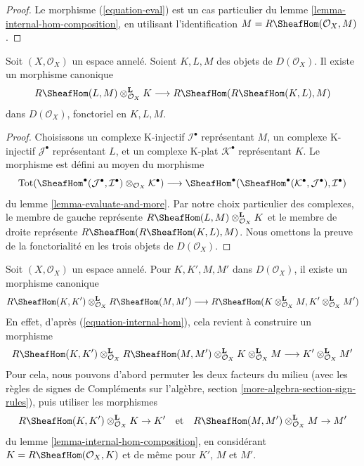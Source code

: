 \begin{proof}
Le morphisme (\ref{equation-eval}) est un cas particulier du lemme \ref{lemma-internal-hom-composition}, en utilisant l'identification $M = R\SheafHom(\mathcal{O}_X, M)$.
\end{proof}

\begin{lemma}

\label{lemma-internal-hom-evaluate}
Soit $(X, \mathcal{O}_X)$ un espace annelé. Soient $K, L, M$ des objets de $D(\mathcal{O}_X)$. Il existe un morphisme canonique $$
R\SheafHom(L, M) \otimes_{\mathcal{O}_X}^\mathbf{L} K
\longrightarrow
R\SheafHom(R\SheafHom(K, L), M)
$$ dans $D(\mathcal{O}_X)$, fonctoriel en $K, L, M$.
\end{lemma}

\begin{proof}
Choisissons un complexe K-injectif $\mathcal{I}^\bullet$ représentant $M$, un complexe K-injectif $\mathcal{J}^\bullet$ représentant $L$, et un complexe K-plat $\mathcal{K}^\bullet$ représentant $K$. Le morphisme est défini au moyen du morphisme $$
\text{Tot}(\SheafHom^\bullet(\mathcal{J}^\bullet,
\mathcal{I}^\bullet) \otimes_{\mathcal{O}_X} \mathcal{K}^\bullet)
\longrightarrow
\SheafHom^\bullet(\SheafHom^\bullet(\mathcal{K}^\bullet,
\mathcal{J}^\bullet), \mathcal{I}^\bullet)
$$ du lemme \ref{lemma-evaluate-and-more}. Par notre choix particulier des complexes, le membre de gauche représente $R\SheafHom(L, M) \otimes_{\mathcal{O}_X}^\mathbf{L} K$ et le membre de droite représente $R\SheafHom(R\SheafHom(K, L), M)$. Nous omettons la preuve de la fonctorialité en les trois objets de $D(\mathcal{O}_X)$.
\end{proof}

\begin{remark}

\label{remark-tensor-internal-hom}

Soit $(X, \mathcal{O}_X)$ un espace annelé. Pour $K, K', M, M'$ dans
$D(\mathcal{O}_X)$, il existe un morphisme canonique
$$
R\SheafHom(K, K') \otimes_{\mathcal{O}_X}^\mathbf{L}
R\SheafHom(M, M')
\longrightarrow
R\SheafHom(K \otimes_{\mathcal{O}_X}^\mathbf{L} M,
K' \otimes_{\mathcal{O}_X}^\mathbf{L} M')
$$
En effet, d'après (\ref{equation-internal-hom}), cela revient à construire un morphisme
$$
R\SheafHom(K, K') \otimes_{\mathcal{O}_X}^\mathbf{L}
R\SheafHom(M, M') \otimes_{\mathcal{O}_X}^\mathbf{L}
K \otimes_{\mathcal{O}_X}^\mathbf{L} M
\longrightarrow
K' \otimes_{\mathcal{O}_X}^\mathbf{L} M'
$$
Pour cela, nous pouvons d'abord permuter les deux facteurs du milieu (avec les règles de signes de Compléments sur l'algèbre, section
\ref{more-algebra-section-sign-rules}), puis utiliser les morphismes
$$
R\SheafHom(K, K') \otimes_{\mathcal{O}_X}^\mathbf{L} K \to K'
\quad\text{et}\quad
R\SheafHom(M, M') \otimes_{\mathcal{O}_X}^\mathbf{L} M \to M'
$$
du lemme \ref{lemma-internal-hom-composition}, en considérant $K = R\SheafHom(\mathcal{O}_X, K)$ et de même pour
$K'$, $M$ et $M'$.

\end{remark}

